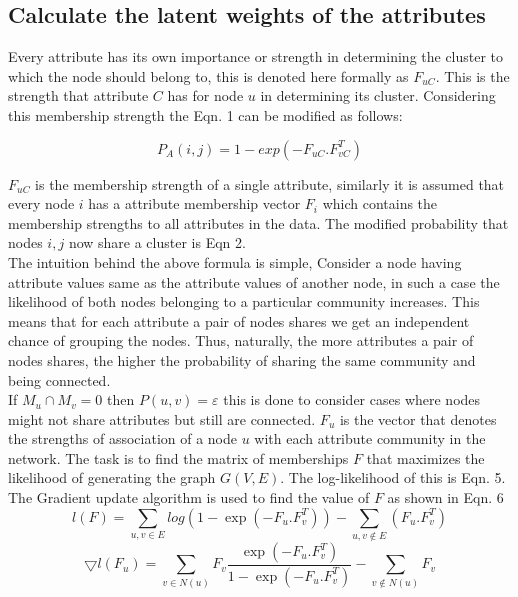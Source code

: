 \subsection{Calculate the latent weights of the attributes}

Every attribute has its own importance or strength in
determining the cluster to which the node should belong to,
this is denoted here formally as $F_{uC}$. This is the strength
that attribute $C$ has for node $u$ in determining its cluster.
Considering this membership strength the Eqn. 1 can be
modified as follows:

\begin{equation}
P_A(i,j) = 1 - exp(-F_{uC}.F_{vC}^T)
\end{equation}

$F_{uC}$ is the membership strength of a single attribute,
similarly it is assumed that every node $i$ has a attribute
membership vector $F_i$ which contains the membership
strengths to all attributes in the data. The modified probability
that nodes $i, j$ now share a cluster is Eqn 2.\\


The intuition behind the above formula is simple, Consider
a node having attribute values same as the attribute values
of another node, in such a case the likelihood of both
nodes belonging to a particular community increases. This
means that for each attribute a pair of nodes shares we
get an independent chance of grouping the nodes. Thus,
naturally, the more attributes a pair of nodes shares, the
higher the probability of sharing the same community and
being connected.\\


 
If $M_u \cap M_v = 0$ then $P(u,v) = \varepsilon$ this is done to consider
cases where nodes might not share attributes but still are
connected. $F_u$ is the vector that denotes the strengths of
association of a node $u$ with each attribute community in the network.
The task is to find the matrix of memberships $F$ that
maximizes the likelihood of generating the graph $G(V,E)$.
The log-likelihood of this is Eqn. 5. The Gradient update
algorithm is used to find the value of $F$ as shown in Eqn. 6 \\

\begin{equation}
l(F) = \sum_{u,v \in E} log(1 - \exp(-F_u.F_v^T)) - \sum_{u,v \notin E}(F_u.F_v^T)
\end{equation}
\begin{equation}
\bigtriangledown l(F_u) = \sum_{v \in N(u)} F_v \frac{\exp(-F_u.F_v^T)}{1 - \exp(-F_u.F_v^T)} - \sum_{v \notin N(u)} F_v
\end{equation}

